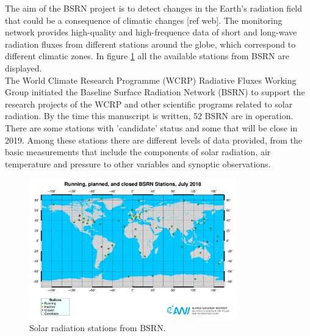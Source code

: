   The aim of the BSRN project is to detect changes in the Earth's radiation field that could be a consequence of climatic changes [ref web]. The monitoring network provides high-quality and high-frequence data of short and long-wave radiation fluxes from different stations around the globe, which correspond to different climatic zones. In figure \ref{fig:bsrnstations} all the available stations from BSRN are displayed.\\

The World Climate Research Programme (WCRP) Radiative Fluxes Working Group initiated the Baseline Surface Radiation Network (BSRN) to support the research projects of the WCRP and other scientific programs related to solar radiation. By the time this manuscript is written, 52 BSRN are in operation. There are some stations with 'candidate' status and some that will be close in 2019. Among these stations there are different levels of data provided, from the basic measurements that include the components of solar radiation, air temperature and pressure to other variables and synoptic observations.

\begin{figure}[h]
  \centering
  \includegraphics[width=0.8\textwidth]{DataMethodsFIGS/bsrn.pdf}
  \caption{Solar radiation stations from BSRN.}
 \label{fig:bsrnstations}
\end{figure}


